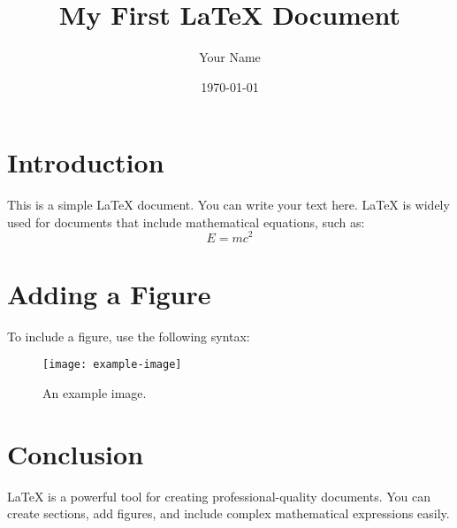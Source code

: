 \documentclass[12pt]{article}  %
\title{My First LaTeX Document}  %
\author{Your Name}              %
\date{\today}                   %
\begin{document}
\maketitle  %

\section{Introduction}  %
This is a simple LaTeX document. You can write your text here. 
LaTeX is widely used for documents that include mathematical equations, such as:
\[
E = mc^2
\] 

\section{Adding a Figure}
To include a figure, use the following syntax:
\begin{figure}[h]
    \centering
    \texttt{[image: example-image]} %
    \caption{An example image.}
\end{figure}

\section{Conclusion}
LaTeX is a powerful tool for creating professional-quality documents. You can create sections, add figures, and include complex mathematical expressions easily.
\end{document}

